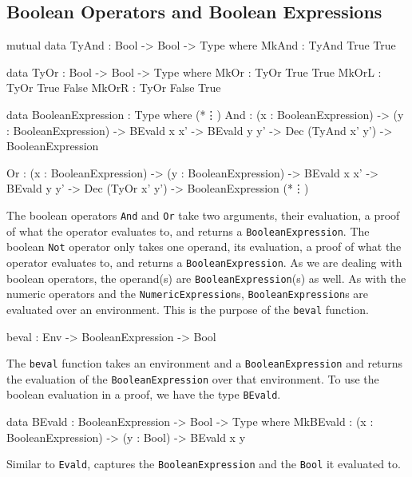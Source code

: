     \subsection{Boolean Operators and Boolean Expressions}
        \begin{code}[caption={The definitions of \texttt{And} and \texttt{Or}},escapeinside={(*}{*)}]
        mutual
            data TyAnd : Bool -> Bool -> Type where
                MkAnd  : TyAnd True True
                
            data TyOr : Bool -> Bool -> Type where
                MkOr  : TyOr True True
                MkOrL : TyOr True False
                MkOrR : TyOr False True
                
            data BooleanExpression : Type where
                (*\vdots*)
                And  : (x : BooleanExpression)
                    -> (y : BooleanExpression)
                    -> BEvald x x'
                    -> BEvald y y'
                    -> Dec (TyAnd x' y')
                    -> BooleanExpression
                    
                Or   : (x : BooleanExpression)
                    -> (y : BooleanExpression)
                    -> BEvald x x'
                    -> BEvald y y'
                    -> Dec (TyOr x' y')
                    -> BooleanExpression
                (*\vdots*)
        \end{code}
        The boolean operators \texttt{And} and \texttt{Or} take two arguments, their evaluation, a proof of what the operator evaluates to, and returns a \texttt{BooleanExpression}. The boolean \texttt{Not} operator only takes one operand, its evaluation, a proof of what the operator evaluates to, and returns a \texttt{BooleanExpression}. As we are dealing with boolean operators, the operand(s) are \texttt{BooleanExpression}(s) as well.
        As with the numeric operators and the \texttt{NumericExpression}s, \texttt{BooleanExpression}s are evaluated over an environment. This is the purpose of the \texttt{beval} function.
        \begin{code}[caption={The type of the \texttt{beval} function}]
            beval : Env -> BooleanExpression -> Bool
        \end{code}
        The \texttt{beval} function takes an environment and a \texttt{BooleanExpression} and returns the evaluation of the \texttt{BooleanExpression} over that environment. To use the boolean evaluation in a proof, we have the type \texttt{BEvald}.
        \begin{code}[caption={The \texttt{BEvald} data type}]
        data BEvald : BooleanExpression -> Bool -> Type where
            MkBEvald : (x : BooleanExpression) ->
                        (y : Bool) -> BEvald x y
        \end{code}
        Similar to \texttt{Evald}, captures the \texttt{BooleanExpression} and the \texttt{Bool} it evaluated to.
        \\\par
        
